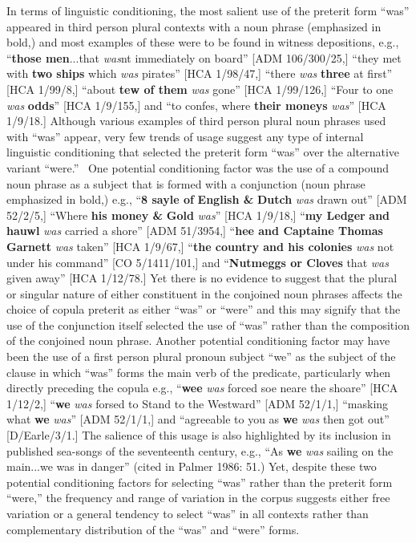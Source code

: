 \begin{styleStandard}
In terms of linguistic conditioning, the most salient use of the preterit form “was” appeared in third person plural contexts with a noun phrase (emphasized in bold,) and most examples of these were to be found in witness depositions, e.g., “\textbf{those men}...that \textit{was}n{\textquotesingle}t immediately on board” [ADM 106/300/25,] “they met with \textbf{two ships} which \textit{was} pirates” [HCA 1/98/47,] “there \textit{was} \textbf{three} at first” [HCA 1/99/8,] “about \textbf{tew of them} \textit{was} gone” [HCA 1/99/126,] “Four to one \textit{was} \textbf{odds}” [HCA 1/9/155,] and “to confes, where \textbf{their moneys} \textit{was}” [HCA 1/9/18.] Although various examples of third person plural noun phrases used with “was” appear, very few trends of usage suggest any type of internal linguistic conditioning that selected the preterit form “was” over the alternative variant “were.” \ One potential conditioning factor was the use of a compound noun phrase as a subject that is formed with a conjunction (noun phrase emphasized in bold,) e.g., “\textbf{8 sayle of} \textbf{English \&} \textbf{Dutch} \textit{was} drawn out” [ADM 52/2/5,] “Where \textbf{his money \&} \textbf{Gold} \textit{was}” [HCA 1/9/18,] “\textbf{my Ledger} \textbf{and} \textbf{hauwl} \textit{was} carried a shore” [ADM 51/3954,] “\textbf{hee and Captaine Thomas Garnett }\textit{was} taken” [HCA 1/9/67,] “\textbf{the country and his colonies} \textit{was} not under his command” [CO 5/1411/101,] and “\textbf{Nutmeggs or Cloves} that \textit{was} given away” [HCA 1/12/78.] Yet there is no evidence to suggest that the plural or singular nature of either constituent in the conjoined noun phrases affects the choice of copula preterit as either “was” or “were” and this may signify that the use of the conjunction itself selected the use of “was” rather than the composition of the conjoined noun phrase. Another potential conditioning factor may have been the use of a first person plural pronoun subject “we” as the subject of the clause in which “was” forms the main verb of the predicate, particularly when directly preceding the copula e.g., “\textbf{wee} \textit{was} forced soe neare the shoare” [HCA 1/12/2,] “\textbf{we} \textit{was} forsed to Stand to the Westward” [ADM 52/1/1,] “masking what \textbf{we} \textit{was}” [ADM 52/1/1,] and “agreeable to you as \textbf{we }\textit{was} then got out” [D/Earle/3/1.] The salience of this usage is also highlighted by its inclusion in published sea-songs of the seventeenth century, e.g., “As \textbf{we }\textit{was} sailing on the main...we was in danger” (cited in Palmer 1986: 51.) Yet, despite these two potential conditioning factors for selecting “was” rather than the preterit form “were,” the frequency and range of variation in the corpus suggests either free variation or a general tendency to select “was” in all contexts rather than complementary distribution of the “was” and “were” forms. 
\end{styleStandard}


